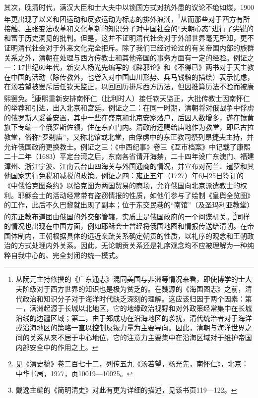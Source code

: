 \documentclass[a4paper, 12pt, openright]{ctexbook}
\begin{document}
其次，晚清时代，满汉大臣和士大夫中以锁国方式对抗外患的议论不绝如缕，1900年更出现了以义和团运动和反教运动为标志的排外浪潮，\footnote{从阮元主持修撰的《广东通志》混同美国与非洲等情况来看，即使博学的士大夫阶级对于西方世界的知识也是极为贫乏的。在魏源的《海国图志》之前，清代政治和知识分子对于海洋时代缺乏深刻的理解。这应该归因于两个因素：第一，满洲起源于长城以北地区，它的地缘政治视野和对外政策经常集中在长城沿线的边疆区域；第二，由于郑成功在沿海地区的袭扰，清代统治者对于海洋或沿海地区的策略一直以控制反叛力量为主要导向。因此，清朝与海洋世界之间的关系从来不居于中心地位，它的注意力主要集中在沿海区域对于维护帝国内部安全中的作用之上。}从而那些对于西方有所接触、主张变法改革和文化革新的知识分子对中国社会的“天朝心态”进行了尖锐的和富于历史洞见的批判。但是，这并不证明清代社会对于外部世界毫无所知，更不证明清代社会对于外来文化完全拒斥。除了我们已经讨论过的有关帝国内部的族群关系之外，清朝在处理与西方传教士和其他帝国的事务方面有一定的经验。例证之一：17世纪60年代，新安人杨光先编写的《辟邪论》和《不得已》两书对于天主教在中国的活动（除传教外，也卷入对中国山川形势、兵马钱粮的描绘）表示忧虑，在汤若望被罢斥后任钦天监正，以回回历排斥西方历法，但因推算历法不验而被康熙罢免。\footnote{见《清史稿》卷二百七十二，列传五九《汤若望，杨光先，南怀仁》，北京：中华书局，1977，页10019—10025。}康熙重新安排南怀仁（比利时人）接任钦天监正，大批传教士因南怀仁的举荐和引进，出入北京和宫廷。例证之二：在同一时期，清朝将对俄战争中俘虏的俄罗斯人妥善安置，其中一些在盛京和北京安家落户，后因人数增多，遂在镶黄旗下专编一个俄罗斯佐领，住在东直门内。清政府还赐给庙地作为教堂，即尼古拉教堂，俗称“罗刹庙”，又称北馆或北堂，由俘虏中的东正教司祭列昂捷夫主持，并允许俄国政府更换教士。例证之三：《中西纪事》卷三《互市档案》中记载了康熙二十二年（1683）平定台湾之后，东南各省请开海禁，二十四年设广东澳门、福建漳州、浙江宁波、江南云台山四海关与外国通商的情况，并宣布对荷兰、暹罗和其他国家实行免税和减税的政策。例证之四：雍正五年（1727）年6月25日签订的《中俄恰克图条约》以恰克图为两国贸易的商场，允许俄国向北京派遣教士的权利。耶稣会士的活动经常带有盗窃情报的性质，如他们参与了绘制《皇舆全览图》的工作，此后不久巴黎就出现了副本；位于东交民巷的“南馆”（及圣玛利亚教堂）的东正教布道团由俄国的外交部管辖，实质上是俄国政府的一个间谍机关。\footnote{戴逸主编的《简明清史》对此有更为详细的描述，见该书页119—122。}同样的情况也出现在中国方面，例如耶稣会士曾经将俄国地图和情报传送给清朝。在帝国体制内，王朝根据具体的远近亲疏关系确定朝贡的性质，以礼序的观念和王朝政治的方式处理内外关系。因此，无论朝贡关系还是礼序观念均不应被理解为一种纯粹自我中心的、完全封闭的统一模式。
\end{document}
